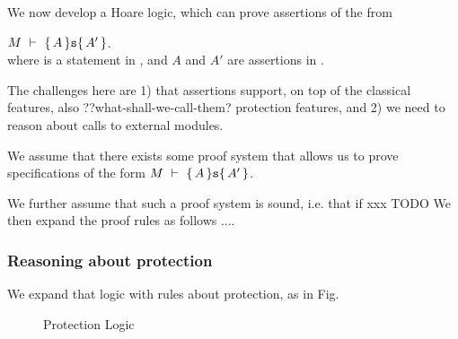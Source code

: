 We now develop a Hoare logic, which can prove assertions of the from \\
\strut \hspace{1cm} $M\ \vdash\ \{\,A\, \} {\texttt{s}} \{\,A'\, \}$.\\
where  is a statement in \Loo, and $A$ and $A'$ are assertions in \AssertLang.

The challenges here are 1) that \AssertLang assertions support, on top of the classical features, also ??what-shall-we-call-them? protection features, and 2) we need to reason about calls to external modules.


We assume that there exists some
proof system  that   allows us to prove 
 specifications of the form  $M\ \vdash\ \{\,A\, \} {\texttt{s}} \{\,A'\, \}$.
{We further assume that such a proof system is sound, i.e. that 
if xxx TODO 
 We then expand the proof rules as follows ....
 


\subsubsection{Reasoning about protection}
We expand that logic with rules about protection, as in Fig. 

\begin{figure}[hbt]
\footnotesize
{}
\caption{Protection Logic}
\label{f:protection}
\end{figure}

}
